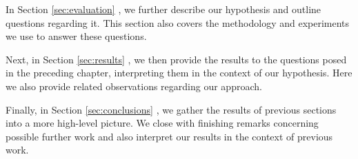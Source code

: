In Section \ref{sec:evaluation} , we further describe our hypothesis and outline questions regarding it. This section also covers the methodology and experiments we use to answer these questions.

Next, in Section \ref{sec:results} , we then provide the results to the questions posed in the preceding chapter, interpreting them in the context of our hypothesis.
Here we also provide related observations regarding our approach.

Finally, in Section \ref{sec:conclusions} , we gather the results of previous sections into a more high-level picture.
We close with finishing remarks concerning possible further work and also interpret our results in the context of previous work.